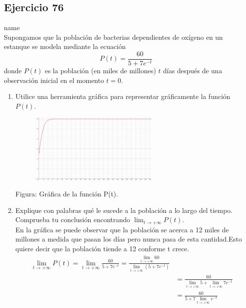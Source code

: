 \documentclass[12pt]{article}
\begin{document}
\subsection{Ejercicio 76} name \\

Supongamos que la población de bacterias dependientes de oxígeno en un estanque se modela mediante la ecuación
\[
P(t)=\frac{60}{5+7e^{-t}}
\]
donde $P(t)$ es la población (en miles de millones) $t$ días después de una observación inicial en el momento $t = 0$.
\begin{enumerate}
\item Utilice una herramienta gráfica para representar gráficamente la función $P(t)$.
  \begin{figure}[H]
\centering
\includegraphics[width=0.6\textwidth]{../img/img_Lista3/poblacionT.png}
  \end{figure}
 Figura: Gráfica de la función P(t).
\item Explique con palabras qué le sucede a la población a lo largo del tiempo. Comprueba tu conclusión encontrando $\lim_{t \to +\infty} P(t)$.\\
  En la gráfica se puede observar que la población se acerca a 12 miles de millones a medida que pasan los días pero nunca pasa de esta cantidad.Esto quiere decir que la población tiende a 12 conforme t crece.\\


\[ \begin{equation*}
  \begin{split}
    \lim_{t \to +\infty} P(t) = \lim_{t \to +\infty} \frac{60}{5+7e^{-t}} = \frac{ \lim_{t \to +\infty} 60}{ \lim_{t \to +\infty} (5+7e^{-t})} \\
    &= \frac{ 60}{ \lim_{t \to +\infty}5+  \lim_{t \to +\infty} 7e^{-t}} \\
   & =  \frac{ 60}{ 5+ 7  \lim_{t \to +\infty} e^{-t}}
 \end{split}
\end{equation*} \]
  

\end{enumerate}
\end{document}
